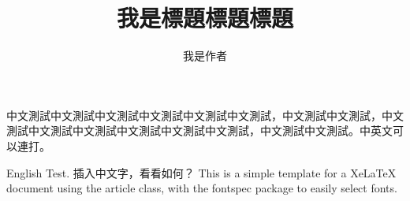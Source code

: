 \documentclass{article}
\title{我是標題標題標題}
\author{我是作者}
\date{} %
\begin{document}
\maketitle

中文測試中文測試中文測試中文測試中文測試中文測試，中文測試中文測試，中文
測試中文測試中文測試中文測試中文測試中文測試，中文測試中文測試。中英文可以連打。

English Test. 插入中文字，看看如何？ This is a simple template for a
XeLaTeX document using the article class, with the fontspec package to
easily select fonts.
\end{document}

